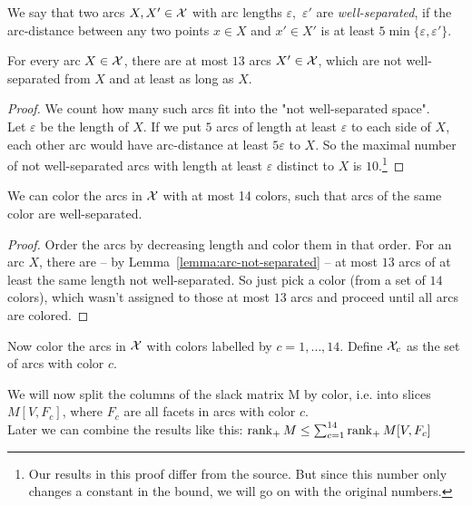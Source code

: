 \begin{definition}
  We say that two arcs $X,X' \in \mathcal{X}$ with arc lengths $\varepsilon$,~$\varepsilon'$ are \emph{well-separated}, if the arc-distance between any two points $x \in X$ and $x' \in X'$ is at least $5 \min\{\varepsilon, \varepsilon'\}$.
\end{definition}

\begin{lemma}\label{lemma:arc-not-separated}
  For every arc $X \in \mathcal{X}$, there are at most $13$ arcs $X' \in \mathcal{X}$, which are not well-separated from $X$ and at least as long as $X$.
\end{lemma}

\begin{proof}
  We count how many such arcs fit into the "not well-separated space".\\
  Let $\varepsilon$ be the length of $X$. If we put $5$ arcs of length at least $\varepsilon$ to each side of $X$, each other arc would have arc-distance at least $5\varepsilon$ to $X$. So the maximal number of not well-separated arcs with length at least $\varepsilon$ distinct to $X$ is $10$.\footnote{Our results in this proof differ from the source. But since this number only changes a constant in the bound, we will go on with the original numbers.} 
\end{proof}

\begin{lemma}
  We can color the arcs in $\mathcal{X}$ with at most 14 colors, such that arcs of the same color are well-separated.
\end{lemma}

\begin{proof}
  Order the arcs by decreasing length and color them in that order. For an arc $X$, there are -- by Lemma~\ref{lemma:arc-not-separated} -- at most $13$ arcs of at least the same length not well-separated. So just pick a color (from a set of $14$ colors), which wasn't assigned to those at most $13$ arcs and proceed until all arcs are colored.
\end{proof}

Now color the arcs in $\mathcal{X}$ with colors labelled by $c=1,\dots,14$. Define $\mathcal{X}_c$ as the set of arcs with color $c$.

We will now split the columns of the slack matrix M by color, i.e. into slices $M[V,F_c]$, where $F_c$ are all facets in arcs with color $c$.\\
Later we can combine the results like this: $\operatorname{rank}_+M \leq \sum_{c=1}^{14} \operatorname{rank}_+ M[V,F_c]$

